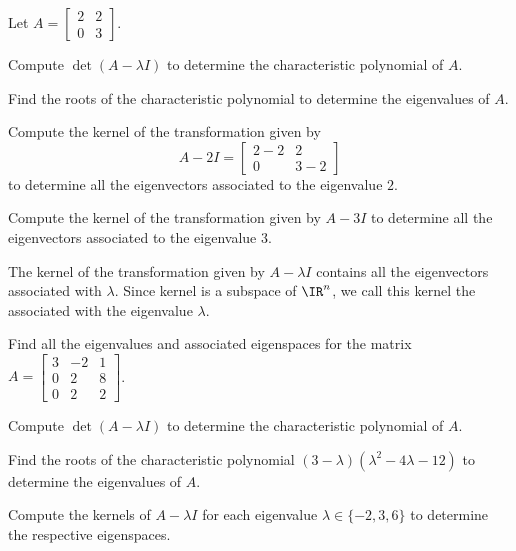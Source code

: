 \begin{applicationActivities}
\begin{activity}{15}
Let $A = \begin{bmatrix} 2 & 2 \\ 0 & 3 \end{bmatrix}$.
\begin{subactivity}
Compute $\det (A-\lambda I)$ to determine the characteristic polynomial of $A$.
\end{subactivity}
\begin{subactivity}
Find the roots of the characteristic polynomial
to determine the eigenvalues of $A$.
\end{subactivity}
\begin{subactivity}
Compute the kernel of the transformation given by
\[
  A-2I
    =
  \begin{bmatrix} 2-2 & 2 \\ 0 & 3-2 \end{bmatrix}
\] to determine all the eigenvectors associated to the eigenvalue $2$.
\end{subactivity}
\begin{subactivity}
Compute the kernel of the transformation given by $A-3I$ to determine all the eigenvectors associated to the eigenvalue $3$.
\end{subactivity}
\end{activity}

\begin{definition}
  The kernel of the transformation given by \(A-\lambda I\) contains
  all the eigenvectors associated with \(\lambda\). Since kernel is a subspace
  of \(\IR^n\), we call this kernel the  associated with the
  eigenvalue \(\lambda\).
\end{definition}


\begin{activity}{15}
  Find all the eigenvalues and associated eigenspaces for the matrix $A=\begin{bmatrix} 3 & -2 & 1 \\  0 & 2 & 8 \\ 0 & 2 & 2 \end{bmatrix}$.

\begin{subactivity}
 Compute $\det (A-\lambda I)$ to determine the characteristic polynomial of $A$.
\end{subactivity}
\begin{subactivity}
Find the roots of the characteristic polynomial
\((3-\lambda)(\lambda^2-4\lambda-12)\)
to determine the eigenvalues of $A$.
\end{subactivity}
\begin{subactivity}
Compute the kernels of $A-\lambda I$ for each eigenvalue
$\lambda\in\{-2,3,6\}$ to determine the respective eigenspaces.
\end{subactivity}
\end{activity}


\end{applicationActivities}

